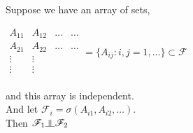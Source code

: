 \documentclass[11pt,fleqn]{book} %
\newcommand{\indep}{\rotatebox[origin=c]{90}{$\models$}}
\begin{document}
\begin{corollary}
	Suppose we have an array of sets, 

	$\begin{matrix}
			A_{11} & A_{12} & \dots & \dots\\
			A_{21} & A_{22} & \dots & \dots\\ 
			\vdots & \vdots & &\\
  			\vdots & \vdots & &\\
		\end{matrix} = \{A_{ij}: i,j = 1, \dots \} \subset \mathscr{F}$

		and this array is independent. \\

		And let $\mathscr{F}_i = \sigma(A_{i1}, A_{i2}, \dots)$.\\

		Then $\mathscr{F}_1 \indep \mathscr{F}_2$
\end{corollary}
\end{document}

